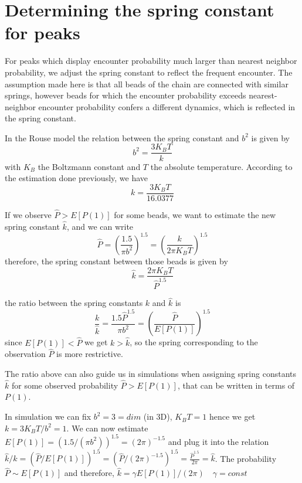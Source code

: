 \documentclass[12pt]{book}
\begin{document}
\section{Determining the spring constant for peaks} 
For peaks which display encounter probability much larger than nearest neighbor probability, we adjust the spring constant to reflect the frequent encounter. The assumption made here is that all beads of the chain are connected with similar springs, however beads for which the encounter probability exceeds nearest-neighbor encounter probability confers a different dynamics, which is reflected in the spring constant.

In the Rouse model the relation between the spring constant and $b^2$ is given by 
\begin{equation*}
b^2=\frac{3K_BT}{k} 
\end{equation*}
with $K_B$ the Boltzmann constant and $T$ the absolute temperature. According to the estimation done previously, we have 
\begin{equation*}
k = \frac{3K_BT}{16.0377}
\end{equation*}
 
If we observe $\hat{P}>E[P(1)]$ for some beads, we want to estimate the new spring constant $\hat{k}$, and we can write 
\begin{equation*}
\hat{P}=\left(\frac{1.5}{\pi b^2}\right)^{1.5} = \left(\frac{k}{2\pi K_BT} \right)^{1.5}
\end{equation*}
therefore, the spring constant between those beads is given by 
\begin{equation*}
\hat{k} = \frac{2\pi K_BT}{\hat{P}^{1.5}}
\end{equation*}

the ratio between the spring constants $k$ and $\hat{k}$ is 
\begin{equation*}
\frac{k}{\hat{k}}= \frac{1.5\hat{P}^{1.5}}{\pi b^2}=\left(\frac{\hat{P}}{E[P(1)]} \right)^{1.5}
\end{equation*}
since $E[P(1)]<\hat{P}$ we get $k>\hat{k}$, so the spring corresponding to the observation $\hat{P}$ is more restrictive. 

The ratio above can also guide us in simulations when assigning spring constants $\hat{k}$ for some observed probability $\hat{P}>E[P(1)]$, that can be written in terms of $P(1)$. 

In simulation we can fix $b^2 = 3 = dim$ (in 3D), $K_BT = 1$ hence we get $k=3K_BT/b^2=1$. We can now estimate $E[P(1)]=(1.5/(\pi b^2))^{1.5}=(2\pi)^{-1.5}$ and plug it into the relation $\hat{k}/k=(\hat{P}/E[P(1)])^{1.5}=(\hat{P}/(2\pi)^{-1.5})^{1.5}= \frac{\hat{P}^{1.5}}{2\pi}=\hat{k}$. The probability $\hat{P}\sim E[P(1)]$ and therefore, $\hat{k}=\gamma E[P(1)]/(2\pi)\quad \gamma=const$
\end{document}
